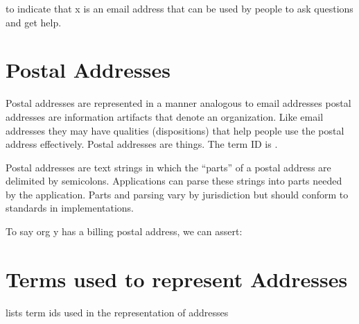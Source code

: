 \documentclass[letterpaper,10pt,english]{sphinxmanual}
\begin{document}
\sphinxAtStartPar
to indicate that x is an email address that can be used by people to ask questions and
get help.


\section{Postal Addresses}
\label{\detokenize{addresses:postal-addresses}}
\sphinxAtStartPar
Postal addresses are represented in a manner analogous to email addresses \textendash{} postal
addresses are information artifacts that denote an organization. Like email
addresses they may have qualities (dispositions) that help people use the postal
address effectively. Postal addresses are things. The term ID is .

\sphinxAtStartPar
Postal addresses are text strings in which the “parts” of a postal address are
delimited by semicolons. Applications can parse these strings into parts needed
by the application. Parts and parsing vary by jurisdiction but should conform to
 standards in implementations.

\sphinxAtStartPar
To say org y has a billing postal address, we can assert:

\begin{sphinxVerbatim}[commandchars=\\\{\}]
  
  
  
  
  
\end{sphinxVerbatim}


\section{Terms used to represent Addresses}
\label{\detokenize{addresses:terms-used-to-represent-addresses}}
\sphinxAtStartPar
{\hyperref[\detokenize{addresses:table-10}]{}} lists term ids used in the representation of addresses
\end{document}
